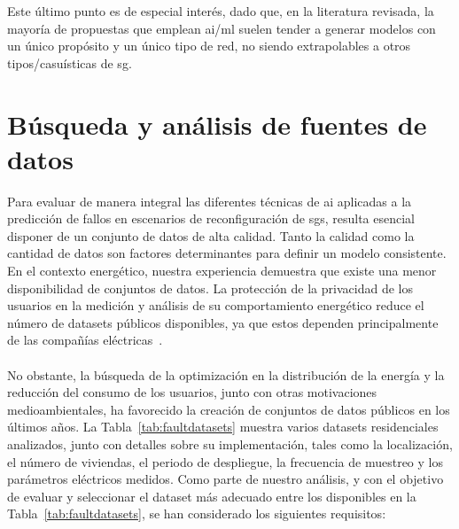 Este último punto es de especial interés, dado que, en la literatura revisada, la mayoría de propuestas que emplean \gls{ai}/\gls{ml} suelen tender a generar modelos con un único propósito y un único tipo de red, no siendo extrapolables a otros tipos/casuísticas de \gls{sg}.




\section{Búsqueda y análisis de fuentes de datos}
\label{sec:Faultdatasets}


Para evaluar de manera integral las diferentes técnicas de \gls{ai} aplicadas a la predicción de fallos en escenarios de reconfiguración de \glspl{sg}, resulta esencial disponer de un conjunto de datos de alta calidad. Tanto la calidad como la cantidad de datos son factores determinantes para definir un modelo consistente. En el contexto energético, nuestra experiencia demuestra que existe una menor disponibilidad de conjuntos de datos. La protección de la privacidad de los usuarios en la medición y análisis de su comportamiento energético reduce el número de datasets públicos disponibles, ya que estos dependen principalmente de las compañías eléctricas~\cite{powercons}.\\
\\
No obstante, la búsqueda de la optimización en la distribución de la energía y la reducción del consumo de los usuarios, junto con otras motivaciones medioambientales, ha favorecido la creación de conjuntos de datos públicos en los últimos años. La Tabla~\ref{tab:faultdatasets} muestra varios datasets residenciales analizados, junto con detalles sobre su implementación, tales como la localización, el número de viviendas, el periodo de despliegue, la frecuencia de muestreo y los parámetros eléctricos medidos. Como parte de nuestro análisis, y con el objetivo de evaluar y seleccionar el dataset más adecuado entre los disponibles en la Tabla~\ref{tab:faultdatasets}, se han considerado los siguientes requisitos:


